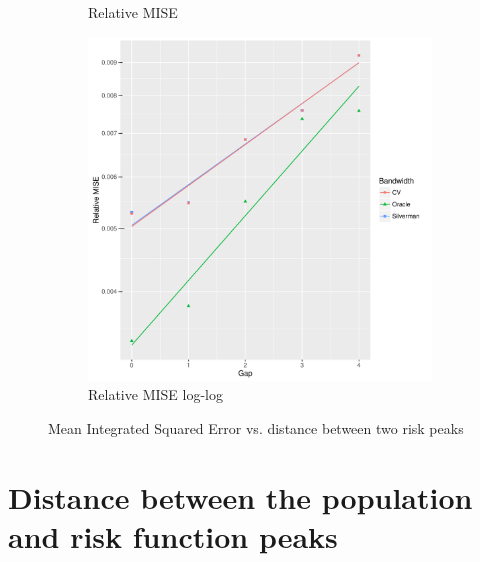 \begin{figure}[htbp]
\begin{subfigure}[b]{0.3\textwidth}
    \caption{Relative MISE}
    \end{subfigure}
    \begin{subfigure}[b]{0.3\textwidth}
    \includegraphics[width=\textwidth]{results/by_two_peaks/RMISE-vs-risk-peak-gap-log-log}
    \caption{Relative MISE log-log}
    \end{subfigure}
    \caption[MISE: by risk decay]{Mean Integrated Squared Error vs. distance between two risk peaks}
    \label{fig:ise:p1.4_100_G}
\end{figure}

\section{Distance between the population and risk function peaks}
\label{sec:ise:p1.4_Gap_risk}

